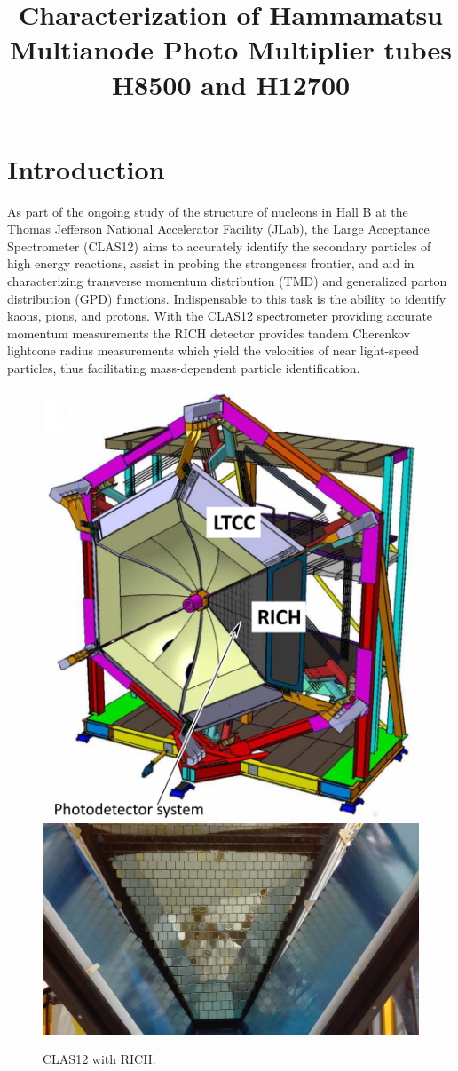 \documentclass[5p,times,preprint]{elsarticle}
\begin{document}
\begin{frontmatter}
\title{Characterization of Hammamatsu Multianode Photo Multiplier tubes H8500 and H12700}
\end{frontmatter}

\section{Introduction}

As part of the ongoing study of the structure of nucleons in Hall B at the Thomas Jefferson National Accelerator Facility (JLab), the Large Acceptance Spectrometer (CLAS12) aims to accurately identify the secondary particles of high energy reactions, assist in probing the strangeness frontier, and aid in characterizing transverse momentum distribution (TMD) and generalized parton distribution (GPD) functions. Indispensable to this task is the ability to identify kaons, pions, and protons.  With the CLAS12 spectrometer providing accurate momentum measurements the RICH detector provides tandem Cherenkov lightcone radius measurements which yield the velocities of near light-speed particles, thus facilitating mass-dependent particle identification.

\begin{figure}[hbt]
	\centering
	\includegraphics[width=0.7\linewidth]{RICHdetector.pdf}
	\includegraphics[width=0.7\linewidth]{RICHpanel_front.png}
	\caption{CLAS12 with RICH.}
	\label{fig:RICHdetector}
\end{figure}
\end{document}
